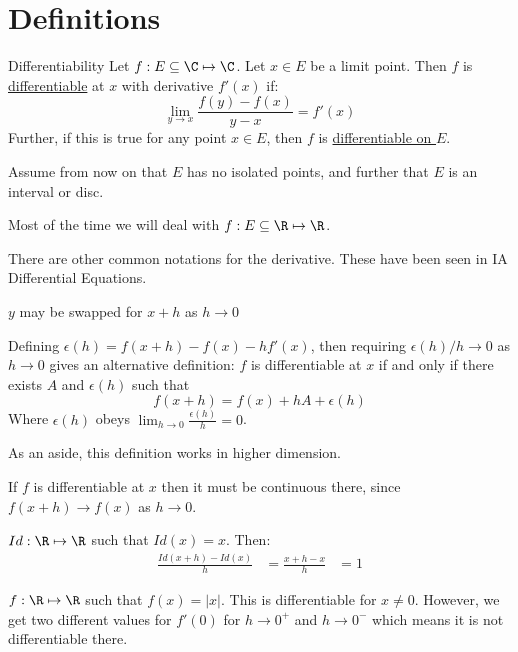 \documentclass[../Main.tex]{subfiles}
\begin{document}
\section{Definitions}
\begin{definition}{Differentiability}
    Let $f : E \subseteq \C \mapsto \C$. Let $x \in E$ be a limit point. Then $f$ is \underline{differentiable} at $x$ with derivative $f'(x)$ if:
    \begin{equation}
        \lim_{y \to x} \frac{f(y) - f(x)}{y - x} = f'(x)
        \label{eqnDifferentiability}
    \end{equation}
    Further, if this is true for any point $x \in E$, then $f$ is \underline{differentiable on $E$}.
\end{definition}
Assume from now on that $E$ has no isolated points, and further that $E$ is an interval or disc.\par
\begin{remarks}
    \item Most of the time we will deal with $f : E \subseteq \R \mapsto \R$.
    \item There are other common notations for the derivative. These have been seen in IA Differential Equations.
    \item $y$ may be swapped for $x + h$ as $h \to 0$
    \item Defining $\epsilon(h) = f(x + h) - f(x) - hf'(x)$, then requiring $\epsilon(h) / h \to 0$ as $h \to 0$ gives an alternative definition:
        $f$ is differentiable at $x$ if and only if there exists $A$ and $\epsilon(h)$ such that
        \begin{equation*}
            f(x + h) = f(x) + hA + \epsilon(h)
        \end{equation*}
        Where $\epsilon(h)$ obeys $\lim_{h \to 0} \frac{\epsilon(h)}{h} = 0$.\par
        As an aside, this definition works in higher dimension.
    \item If $f$ is differentiable at $x$ then it must be continuous there, since $f(x + h) \to f(x)$ as $h \to 0$.
\end{remarks}
\begin{examples}{}
    \item $Id : \R \mapsto \R$ such that $Id(x) = x$. Then:
        \begin{align*}
            \frac{Id(x + h) - Id(x)}{h} &= \frac{x + h - x}{h}
            &= 1
        \end{align*}
    \item $f : \R \mapsto \R$ such that $f(x) = |x|$. This is differentiable for $x \neq 0$. However, we get two different values for $f'(0)$ for $h \to 0^+$ and $h \to 0^-$ which means it is not differentiable there.
\end{examples}
\end{document}

